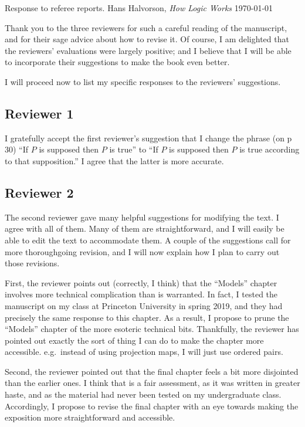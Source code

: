 \documentclass[12pt]{article}
\begin{document}
\noindent Response to referee reports.  Hans Halvorson, \emph{How
  Logic Works} \newline 
\noindent \today 

\bigskip \noindent Thank you to the three reviewers for such a careful
reading of the manuscript, and for their sage advice about how to
revise it.  Of course, I am delighted that the reviewers' evaluations
were largely positive; and I believe that I will be able to
incorporate their suggestions to make the book even better.

I will proceed now to list my specific responses to the reviewers'
suggestions.

\subsection*{Reviewer 1}

I gratefully accept the first reviewer's suggestion that I
  change the phrase (on p 30) ``If $P$ is supposed then $P$ is true''
  to ``If $P$ is supposed then $P$ is true according to that
  supposition.''  I agree that the latter is more accurate.

  \subsection*{Reviewer 2}

  The second reviewer gave many helpful suggestions for modifying the
  text.  I agree with all of them.  Many of them are straightforward,
  and I will easily be able to edit the text to accommodate them.  A
  couple of the suggestions call for more thoroughgoing revision, and
  I will now explain how I plan to carry out those revisions.
  
  First, the reviewer points out (correctly, I think) that the
  ``Models'' chapter involves more technical complication than is
  warranted.  In fact, I tested the manuscript on my class at
  Princeton University in spring 2019, and they had precisely the same
  response to this chapter.  As a result, I propose to prune the
  ``Models'' chapter of the more esoteric technical bits.  Thankfully,
  the reviewer has pointed out exactly the sort of thing I can do to
  make the chapter more accessible.  e.g.\ instead of using projection
  maps, I will just use ordered pairs.

  Second, the reviewer pointed out that the final chapter feels a bit
  more disjointed than the earlier ones.  I think that is a fair
  assessment, as it was written in greater haste, and as the material
  had never been tested on my undergraduate class.  Accordingly, I
  propose to revise the final chapter with an eye towards making the
  exposition more straightforward and accessible.
\end{document}
